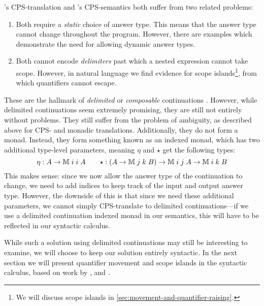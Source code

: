 \documentclass[a4paper]{article}
\begin{document}
\vspace*{1\baselineskip}

\citeauthor{barker2004}'s CPS-translation and
\citeauthor{moortgat2012}'s CPS-semantics both suffer from two related
problems:
\begin{enumerate}
\item Both require a \emph{static} choice of answer type. This
  means that the answer type cannot change throughout the
  program. However, there are examples which demonstrate the need for
  allowing dynamic answer types.
\item Both cannot encode \emph{delimiters} past which a nested
  expression cannot take scope. However, in natural language we find
  evidence for scope islands\footnote{%
    We will discuss scope islands in
    \autoref{sec:movement-and-quantifier-raising}.
  }, from which quantifiers cannot escape.
\end{enumerate}
These are the hallmark of \emph{delimited} or \emph{composable}
continuations \citep{danvy1990}. However, while delimited
continuations seem extremely promising, they are still not entirely
without problems. They still suffer from the problem of ambiguity, as
described above for CPS- and monadic translations. Additionally, they
do not form a monad. Instead, they form something known as an indexed
monad, which has two additional type-level parameters, meaning $\eta$
and $\star$ get the following types:
\[
  \eta : A\rightarrow\mathbb{M}\;i\;i\;A
  \qquad
  \star: (A\rightarrow\mathbb{M}\;j\;k\;B)\rightarrow\mathbb{M}\;i\;j\;A\rightarrow\mathbb{M}\;i\;k\;B
\]
This makes sense: since we now allow the answer type of the
continuation to change, we need to add indices to keep track of the
input and output answer type. However, the downside of this is that
since we need these additional parameters, we cannot simply
CPS-translate to delimited continuations---if we use a delimited
continuation indexed monad in our semantics, this will have to be
reflected in our syntactic calculus.

While such a solution using delimited continuations may still be
interesting to examine, we will choose to keep our solution entirely
syntactic. In the next section we will present quantifier movement and
scope islands in the syntactic calculus, based on work by
\citet{moortgat1996}, \citet{barker2007} and \citet{barker2015}.
\end{document}
